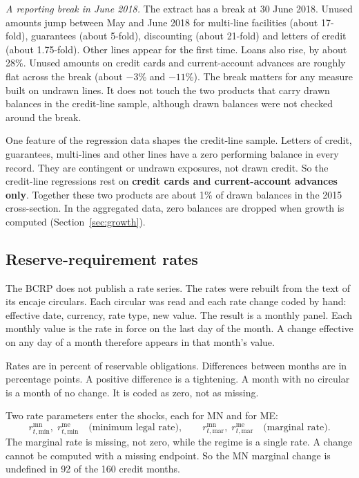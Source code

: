 \documentclass[11pt]{article}
\renewcommand{\_}{\origunderscore\hspace{0pt}}  %
\newcommand{\MN}{\mathrm{mn}}
\newcommand{\ME}{\mathrm{me}}
\begin{document}
\textit{A reporting break in June 2018.}
The extract has a break at 30 June 2018.
Unused amounts jump between May and June 2018 for multi-line facilities (about 17-fold), guarantees (about 5-fold), discounting (about 21-fold) and letters of credit (about 1.75-fold).
Other lines appear for the first time.
Loans also rise, by about 28\%.
Unused amounts on credit cards and current-account advances are roughly flat across the break (about $-3$\% and $-11$\%).
The break matters for any measure built on undrawn lines.
It does not touch the two products that carry drawn balances in the credit-line sample, although drawn balances were not checked around the break.

One feature of the regression data shapes the credit-line sample.
Letters of credit, guarantees, multi-lines and other lines have a zero performing balance in every record.
They are contingent or undrawn exposures, not drawn credit.
So the credit-line regressions rest on \textbf{credit cards and current-account advances only}.
Together these two products are about 1\% of drawn balances in the 2015 cross-section.
In the aggregated data, zero balances are dropped when growth is computed (Section~\ref{sec:growth}).

\subsection{Reserve-requirement rates}

The BCRP does not publish a rate series.
The rates were rebuilt from the text of its encaje circulars.
Each circular was read and each rate change coded by hand: effective date, currency, rate type, new value.
The result is a monthly panel.
Each monthly value is the rate in force on the last day of the month.
A change effective on any day of a month therefore appears in that month's value.

Rates are in percent of reservable obligations.
Differences between months are in percentage points.
A positive difference is a tightening.
A month with no circular is a month of no change.
It is coded as zero, not as missing.

Two rate parameters enter the shocks, each for MN and for ME:
\begin{equation*}
r^{\MN}_{t,\text{min}},\; r^{\ME}_{t,\text{min}} \quad \text{(minimum legal rate)}, \qquad
r^{\MN}_{t,\text{mar}},\; r^{\ME}_{t,\text{mar}} \quad \text{(marginal rate)}.
\end{equation*}
The marginal rate is missing, not zero, while the regime is a single rate.
A change cannot be computed with a missing endpoint.
So the MN marginal change is undefined in 92 of the 160 credit months.
\end{document}
